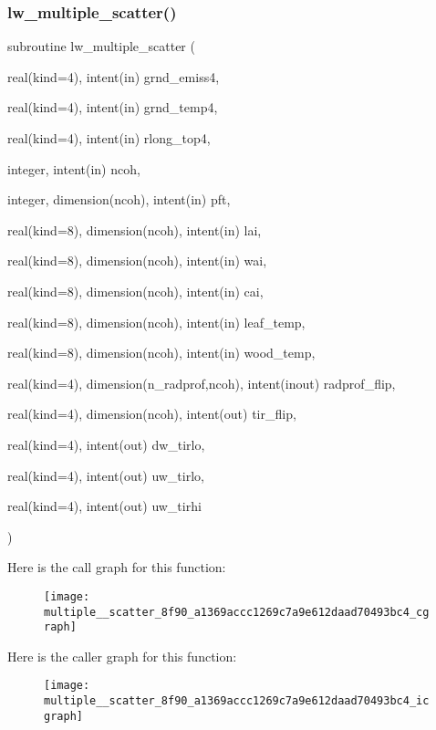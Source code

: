 \subsubsection{\texorpdfstring{lw\+\_\+multiple\+\_\+scatter()}{lw\_multiple\_scatter()}}
{\footnotesize\ttfamily subroutine lw\+\_\+multiple\+\_\+scatter (\begin{DoxyParamCaption}\item[{real(kind=4), intent(in)}]{grnd\+\_\+emiss4,  }\item[{real(kind=4), intent(in)}]{grnd\+\_\+temp4,  }\item[{real(kind=4), intent(in)}]{rlong\+\_\+top4,  }\item[{integer, intent(in)}]{ncoh,  }\item[{integer, dimension(ncoh), intent(in)}]{pft,  }\item[{real(kind=8), dimension(ncoh), intent(in)}]{lai,  }\item[{real(kind=8), dimension(ncoh), intent(in)}]{wai,  }\item[{real(kind=8), dimension(ncoh), intent(in)}]{cai,  }\item[{real(kind=8), dimension(ncoh), intent(in)}]{leaf\+\_\+temp,  }\item[{real(kind=8), dimension(ncoh), intent(in)}]{wood\+\_\+temp,  }\item[{real(kind=4), dimension(n\+\_\+radprof,ncoh), intent(inout)}]{radprof\+\_\+flip,  }\item[{real(kind=4), dimension(ncoh), intent(out)}]{tir\+\_\+flip,  }\item[{real(kind=4), intent(out)}]{dw\+\_\+tirlo,  }\item[{real(kind=4), intent(out)}]{uw\+\_\+tirlo,  }\item[{real(kind=4), intent(out)}]{uw\+\_\+tirhi }\end{DoxyParamCaption})}

Here is the call graph for this function\+:
\nopagebreak
\begin{figure}[H]
\begin{center}
\leavevmode
\texttt{[image: multiple\_\_scatter\_8f90\_a1369accc1269c7a9e612daad70493bc4\_cgraph]}
\end{center}
\end{figure}
Here is the caller graph for this function\+:
\nopagebreak
\begin{figure}[H]
\begin{center}
\leavevmode
\texttt{[image: multiple\_\_scatter\_8f90\_a1369accc1269c7a9e612daad70493bc4\_icgraph]}
\end{center}
\end{figure}
\mbox{\label{multiple__scatter_8f90_a6388f60b78ad37f8864f30cfd6a3cf62}} 

